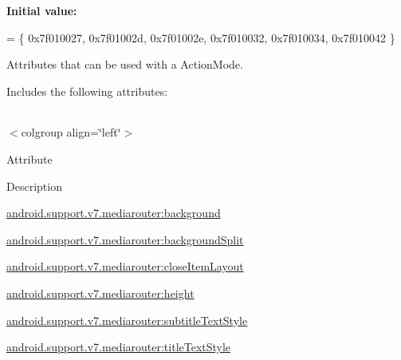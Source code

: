 {\bfseries Initial value\+:}
\begin{DoxyCode}
= \{
            0x7f010027, 0x7f01002d, 0x7f01002e, 0x7f010032,
            0x7f010034, 0x7f010042
        \}
\end{DoxyCode}
Attributes that can be used with a Action\+Mode. 

Includes the following attributes\+:

\tabulinesep=1mm
\begin{longtabu} spread 0pt [c]{*{0}{|X[-1]}|}
\hline
\end{longtabu}
$<$colgroup align=\char`\"{}left\char`\"{}$>$ 

Attribute

Description 

{\ttfamily \hyperlink{classandroid_1_1support_1_1v7_1_1mediarouter_1_1R_1_1styleable_aa87c515bab8d3e31a7192b8646436959}{android.\+support.\+v7.\+mediarouter\+:background}}

{\ttfamily \hyperlink{classandroid_1_1support_1_1v7_1_1mediarouter_1_1R_1_1styleable_a964de6792a0ef91d9a277bff3796c597}{android.\+support.\+v7.\+mediarouter\+:background\+Split}}

{\ttfamily \hyperlink{classandroid_1_1support_1_1v7_1_1mediarouter_1_1R_1_1styleable_a544a453f2ea1703ee087d75cc3da448d}{android.\+support.\+v7.\+mediarouter\+:close\+Item\+Layout}}

{\ttfamily \hyperlink{classandroid_1_1support_1_1v7_1_1mediarouter_1_1R_1_1styleable_a6b8d66b42ebc726d21097cf62e090d8a}{android.\+support.\+v7.\+mediarouter\+:height}}

{\ttfamily \hyperlink{classandroid_1_1support_1_1v7_1_1mediarouter_1_1R_1_1styleable_a7c9b319454742dd79494960a4a144757}{android.\+support.\+v7.\+mediarouter\+:subtitle\+Text\+Style}}

{\ttfamily \hyperlink{classandroid_1_1support_1_1v7_1_1mediarouter_1_1R_1_1styleable_a448e15fac45ca973519260e405b17757}{android.\+support.\+v7.\+mediarouter\+:title\+Text\+Style}}

